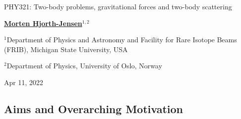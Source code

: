\documentclass[%
oneside,                 %
final,                   %
10pt]{article}
\begin{document}

\newcommand{\exercisesection}[1]{\subsection*{#1}}






\thispagestyle{empty}

\begin{center}
{\LARGE\bf
\begin{spacing}{1.25}
PHY321: Two-body problems, gravitational forces and two-body scattering 
\end{spacing}
}
\end{center}


\begin{center}
{\bf \href{{http://mhjgit.github.io/info}}{Morten Hjorth-Jensen}${}^{1, 2}$} \\ [0mm]
\end{center}

\begin{center}
\centerline{{\small ${}^1$Department of Physics and Astronomy and Facility for Rare Isotope Beams (FRIB), Michigan State University, USA}}
\centerline{{\small ${}^2$Department of Physics, University of Oslo, Norway}}
\end{center}
    

\begin{center}
Apr 11, 2022
\end{center}

\vspace{1cm}


\subsection*{Aims and Overarching Motivation}
\end{document}
